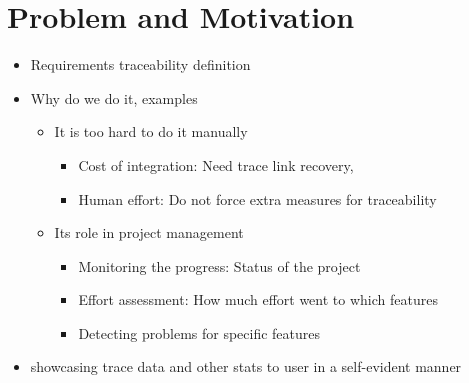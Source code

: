 \documentclass[conference]{IEEEtran}
\begin{document}
\section{Problem and Motivation}
\label{section:problem}


\begin{itemize}
    \item Requirements traceability definition
    \item Why do we do it, examples
    \begin{itemize}
        \item It is too hard to do it manually
        \begin{itemize}
            \item Cost of integration: Need trace link recovery, 
            \item Human effort: Do not force extra measures for traceability
        \end{itemize}
        \item Its role in project management
        \begin{itemize}
            \item Monitoring the progress: Status of the project
            \item Effort assessment: How much effort went to which features
            \item Detecting problems for specific features
        \end{itemize}
    \end{itemize}
    \item showcasing trace data and other stats to user in a self-evident manner
\end{itemize}
\end{document}

